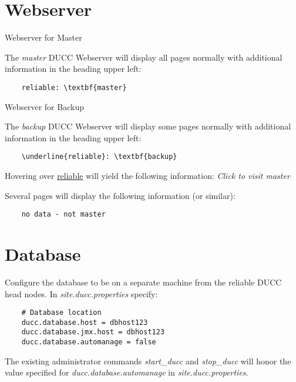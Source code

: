 \section{Webserver}

	Webserver for Master

	The {\em master} DUCC Webserver will display all pages normally with additional
	information in the heading upper left:
	
	\begin{verbatim}
	reliable: \textbf{master}
   	\end{verbatim}
	
	Webserver for Backup
	
	The {\em backup} DUCC Webserver will display some pages normally with additional
	information in the heading upper left:
	
	\begin{verbatim}
	\underline{reliable}: \textbf{backup}
   	\end{verbatim}
   	
   	Hovering over \underline{reliable} will yield the following information:
   	{\em Click to visit master}
   	
   	Several pages will display the following information (or similar):
   	
   	\begin{verbatim}
	no data - not master
   	\end{verbatim}

\section{Database}

	Configure the database to be on a separate machine from the reliable DUCC head nodes.
	In {\em site.ducc.properties} specify:
	
	\begin{verbatim}
	# Database location
    ducc.database.host = dbhost123
    ducc.database.jmx.host = dbhost123
    ducc.database.automanage = false
   	\end{verbatim}
   	
   	The existing administrator commands {\em start\_ducc} and {\em stop\_ducc} will
   	honor the value specified for {\em ducc.database.automanage} in {\em site.ducc.properties}.
